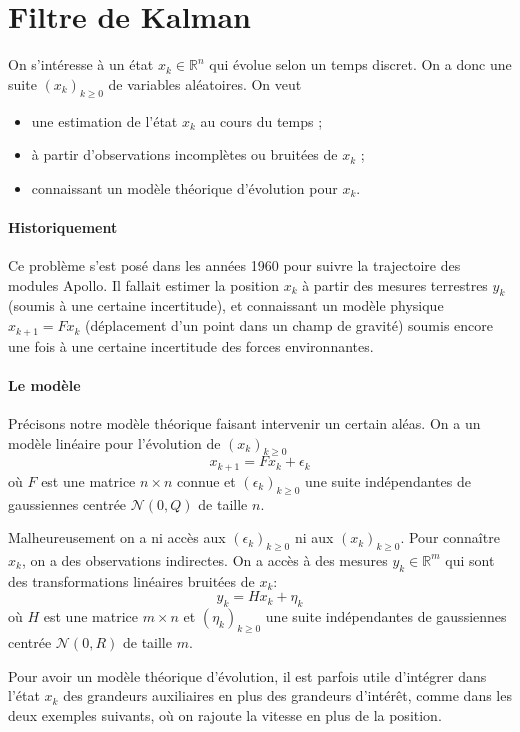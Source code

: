 \documentclass[a4paper,12pt]{book}
\begin{document}
\section{Filtre de Kalman}

On s'intéresse à un état $x_k\in \mathbb{R}^n$ qui évolue selon un temps discret. On a donc une suite $(x_k)_{k\geq 0}$ de variables aléatoires. On veut
\begin{itemize}\item une estimation de l'état $x_k$ au cours du temps ;
\item à partir d'observations incomplètes ou bruitées de $x_k$ ;
\item connaissant un modèle théorique d'évolution pour $x_k$.
\end{itemize}

\paragraph{Historiquement} Ce problème s'est posé dans les années 1960 pour suivre la trajectoire des modules Apollo. Il fallait estimer la position $x_k$ à partir des mesures terrestres $y_k$ (soumis à une certaine incertitude), et connaissant un modèle physique $x_{k+1}=Fx_k$ (déplacement d'un point dans un champ de gravité) soumis encore une fois à une certaine incertitude des forces environnantes.


\paragraph{Le modèle}

Précisons notre modèle théorique faisant intervenir un certain aléas. On a un modèle linéaire pour l'évolution de $(x_k)_{k\geq 0}$
$$x_{k+1}=Fx_k+ \epsilon_k$$
où $F$ est une matrice $n\times n$ connue et $(\epsilon_k)_{k\geq 0}$ une suite indépendantes de gaussiennes centrée $\mathcal{N}(0,Q)$ de taille $n$.

Malheureusement on a ni accès aux $(\epsilon_k)_{k\geq 0}$ ni aux $(x_k)_{k\geq 0}$. Pour connaître $x_k$, on a des observations indirectes. On a accès à des mesures $y_k\in \mathbb{R}^m$ qui sont des transformations linéaires bruitées de $x_k$:
$$y_{k}=Hx_k+ \eta_k$$
où $H$ est une matrice $m\times n $ et $(\eta_k)_{k\geq 0}$ une suite indépendantes de gaussiennes centrée $\mathcal{N}(0,R)$ de taille $m$.

Pour avoir un modèle théorique d'évolution, il est parfois utile d'intégrer dans l'état $x_k$ des grandeurs auxiliaires en plus des grandeurs d'intérêt, comme dans les deux exemples suivants, où on rajoute la vitesse en plus de la position.
\end{document}
